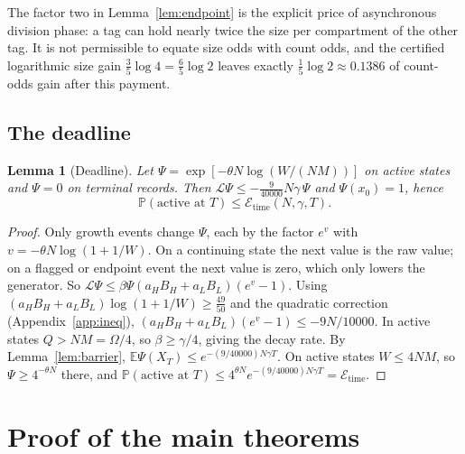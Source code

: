 \documentclass[11pt,a4paper]{article}
\theoremstyle{plain}
\newtheorem{lemma}[theorem]{Lemma}
\theoremstyle{definition}
\theoremstyle{remark}
\newcommand{\E}{\mathbb E}
\newcommand{\Prb}{\mathbb P}
\newcommand{\cL}{\mathcal L}
\newcommand{\Etime}{\mathcal E_{\mathrm{time}}}
\begin{document}
The factor two in Lemma~\ref{lem:endpoint} is the explicit price of asynchronous division phase: a tag can hold nearly twice the size per compartment of the other tag. It is not permissible to equate size odds with count odds, and the certified logarithmic size gain $\frac35\log4=\frac65\log2$ leaves exactly $\frac15\log2\approx0.1386$ of count-odds gain after this payment.

\subsection{The deadline}
\begin{lemma}[Deadline]\label{lem:deadline}
Let $\Psi=\exp[-\theta N\log(W/(NM))]$ on active states and $\Psi=0$ on terminal records. Then $\cL\Psi\leq-\frac{9}{40000}N\gamma\,\Psi$ and $\Psi(x_0)=1$, hence
\begin{equation}\label{eq:deadline}
\Prb(\text{active at }T)\leq\Etime(N,\gamma,T).
\end{equation}
\end{lemma}
\begin{proof}
Only growth events change $\Psi$, each by the factor $e^{v}$ with $v=-\theta N\log(1+1/W)$. On a continuing state the next value is the raw value; on a flagged or endpoint event the next value is zero, which only lowers the generator. So $\cL\Psi\leq\beta\Psi(a_HB_H+a_LB_L)(e^{v}-1)$. Using $(a_HB_H+a_LB_L)\log(1+1/W)\geq\frac{49}{50}$ and the quadratic correction (Appendix~\ref{app:ineq}), $(a_HB_H+a_LB_L)(e^v-1)\leq-9N/10000$. In active states $Q>NM=\Omega/4$, so $\beta\geq\gamma/4$, giving the decay rate. By Lemma~\ref{lem:barrier}, $\E\Psi(X_T)\leq e^{-(9/40000)N\gamma T}$. On active states $W\leq4NM$, so $\Psi\geq4^{-\theta N}$ there, and $\Prb(\text{active at }T)\leq4^{\theta N}e^{-(9/40000)N\gamma T}=\Etime$.
\end{proof}

\section{Proof of the main theorems}\label{sec:assembly}
\end{document}
